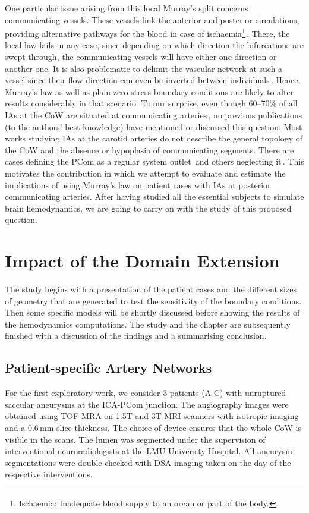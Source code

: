 One particular issue arising from this local Murray's split concerns communicating vessels. These vessels link the anterior and posterior circulations, providing alternative pathways for the blood in case of ischaemia\footnote{Ischaemia: Inadequate blood supply to an organ or part of the body.}\,\cite{Liebeskind2016}. There, the local law fails in any case, since depending on which direction the bifurcations are swept through, the communicating vessels will have either one direction or another one. It is also problematic to delimit the vascular network at such a vessel since their flow direction can even be inverted between individuals\,\cite{Zhang2016}. Hence, Murray's law as well as plain zero-stress boundary conditions are likely to alter results considerably in that scenario. To our surprise, even though 60--70\% of all IAs at the CoW are situated at communicating arteries\,\cite{Hacein-Bey2011}, no previous publications (to the authors' best knowledge) have mentioned or discussed this question. Most works studying IAs at the carotid arteries do not describe the general topology of the CoW and the absence or hypoplasia of communicating segments. There are cases defining the PCom as a regular system outlet\,\cite{Chnafa2017, Chnafa2018} and others neglecting it\,\cite{Castro2006, Dennis2017}. This motivates the contribution in which we attempt to evaluate and estimate the implications of using Murray's law on patient cases with IAs at posterior communicating arteries. After having studied all the essential subjects to simulate brain hemodynamics, we are going to carry on with the study of this proposed question.


\section{Impact of the Domain Extension}\label{chap3:sec3}
The study begins with a presentation of the patient cases and the different sizes of geometry that are generated to test the sensitivity of the boundary conditions. Then some specific models will be shortly discussed before showing the results of the hemodynamics computations. The study and the chapter are subsequently finished with a discussion of the findings and a summarising conclusion.

\subsection{Patient-specific Artery Networks}
For the first exploratory work, we consider 3 patients (A-C) with unruptured saccular aneurysms at the ICA-PCom junction. The angiography images were obtained using TOF-MRA on 1.5T and 3T MRI scanners with isotropic imaging and a 0.6\,mm slice thickness. The choice of device ensures that the whole CoW is visible in the scans. The lumen was segmented under the supervision of interventional neuroradiologists at the LMU University Hospital. All aneurysm segmentations were double-checked with DSA imaging taken on the day of the respective interventions.

